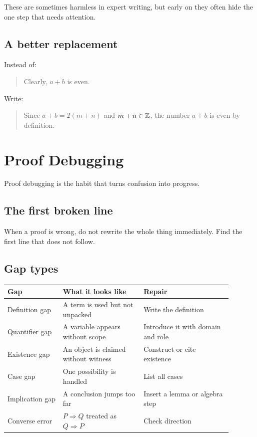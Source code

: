 \documentclass[11pt]{article}
\begin{document}
These are sometimes harmless in expert writing, but early on they often hide the one step that needs attention.

\subsection{A better replacement}

Instead of:

\begin{quote}
Clearly, $a+b$ is even.
\end{quote}

Write:

\begin{quote}
Since $a+b=2(m+n)$ and $m+n\in\mathbb{Z}$, the number $a+b$ is even by definition.
\end{quote}

\newpage
\section{Proof Debugging}

Proof debugging is the habit that turns confusion into progress.

\subsection{The first broken line}

When a proof is wrong, do not rewrite the whole thing immediately. Find the first line that does not follow.

\subsection{Gap types}

\begin{longtable}{p{0.22\linewidth}p{0.32\linewidth}p{0.35\linewidth}}
\toprule
Gap & What it looks like & Repair \\
\midrule
Definition gap & A term is used but not unpacked & Write the definition \\
Quantifier gap & A variable appears without scope & Introduce it with domain and role \\
Existence gap & An object is claimed without witness & Construct or cite existence \\
Case gap & One possibility is handled & List all cases \\
Implication gap & A conclusion jumps too far & Insert a lemma or algebra step \\
Converse error & $P\Rightarrow Q$ treated as $Q\Rightarrow P$ & Check direction \\
\bottomrule
\end{longtable}
\end{document}
